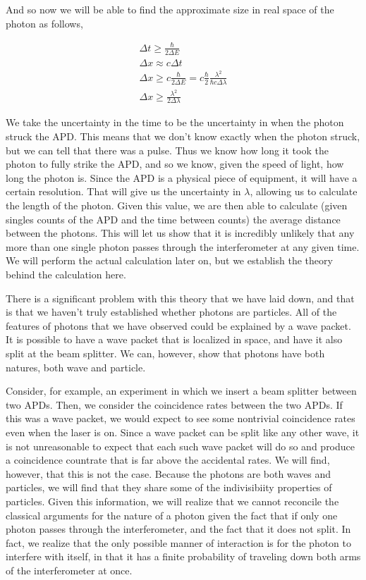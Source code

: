 \documentclass{article}
\begin{document}
	And so now we will be able to find the approximate size in real space of the photon as follows,

	\begin{gather*}
		\Delta t \geq \frac{\hbar}{2\Delta E} \\
		\Delta x \approx c\Delta t \\
		\Delta x \geq c\frac{\hbar}{2\Delta E} = c\frac{\hbar}{2}\frac{\lambda^2}{\hbar c \Delta \lambda} \\
		\Delta x \geq \frac{\lambda^2}{2\Delta \lambda}
	\end{gather*}

	We take the uncertainty in the time to be the uncertainty in when the photon struck the APD.  This means that we don't know exactly when the photon struck, but we can tell that there was a pulse.  Thus we know how long it took the photon to fully strike the APD, and so we know, given the speed of light, how long the photon is.  Since the APD is a physical piece of equipment, it will have a certain resolution.  That will give us the uncertainty in $\lambda$, allowing us to calculate the length of the photon.  Given this value, we are then able to calculate (given singles counts of the APD and the time between counts) the average distance between the photons.  This will let us show that it is incredibly unlikely that any more than one single photon passes through the interferometer at any given time.  We will perform the actual calculation later on, but we establish the theory behind the calculation here.

	\hspace{.5cm}

	There is a significant problem with this theory that we have laid down, and that is that we haven't truly established whether photons are particles.  All of the features of photons that we have observed could be explained by a wave packet.  It is possible to have a wave packet that is localized in space, and have it also split at the beam splitter.  We can, however, show that photons have both natures, both wave and particle.

	\hspace{.5cm}

	Consider, for example, an experiment in which we insert a beam splitter between two APDs.  Then, we consider the coincidence rates between the two APDs.  If this was a wave packet, we would expect to see some nontrivial coincidence rates even when the laser is on.  Since a wave packet can be split like any other wave, it is not unreasonable to expect that each such wave packet will do so and produce a coincidence countrate that is far above the accidental rates.  We will find, however, that this is not the case.  Because the photons are both waves and particles, we will find that they share some of the indivisibiity properties of particles.  Given this information, we will realize that we cannot reconcile the classical arguments for the nature of a photon given the fact that if only one photon passes through the interferometer, and the fact that it does not split.  In fact, we realize that the only possible manner of interaction is for the photon to interfere with itself, in that it has a finite probability of traveling down both arms of the interferometer at once.
\end{document}
